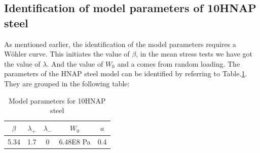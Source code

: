 \subsection{Identification of model parameters of 10HNAP steel}
As mentioned earlier, the identification of the model parameters requires a Wöhler curve. This initiates the value of $\beta$, in the mean stress tests we have got the value of $\lambda$. And the value of $W_0$ and a comes from random loading. The parameters of the HNAP steel model can be identified by referring to Table.\ref{tab.10HNAP.para}. They are grouped in the following table:
\begin{table}[!h]
\centering
\begin{tabular}{|c|c|c|c|c|}
	\hline
	\textbf{$\beta$} & \textbf{$\lambda_+$} & \textbf{$\lambda_-$} & \textbf{$W_0$} & \textbf{$a$}  \\ \hline
	5.34    & 1.7 &0         &6.48E8 Pa  & 0.4    \\ \hline
\end{tabular}
\caption{Model parameters for 10HNAP steel}
\label{tab.10HNAP.para}
\end{table}

